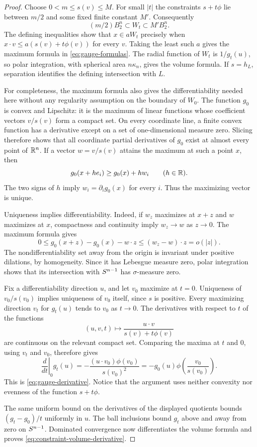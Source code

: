 \begin{proof}
Choose $0<m\le s(v)\le M$.  For small $|t|$ the constraints
$s+t\phi$ lie between $m/2$ and some fixed finite constant $M'$.
Consequently
\[
 (m/2)B_2^n\subset W_t\subset M'B_2^n.
\]
The defining inequalities show that $x\in aW_t$ precisely when
$x\cdot v\le a(s(v)+t\phi(v))$ for every $v$.  Taking the least
such $a$ gives the maximum formula in \eqref{eq:gauge-formulas}.
The radial function of $W_t$ is $1/g_t(u)$, so polar integration,
with spherical area $n\kappa_n$, gives the volume formula.  If
$s=h_L$, separation identifies the defining intersection with $L$.

For completeness, the maximum formula also gives the differentiability
needed here without any regularity assumption on the boundary of
$W_0$.  The function $g_0$ is convex and Lipschitz: it is the maximum
of linear functions whose coefficient vectors $v/s(v)$ form a compact
set.  On every coordinate line, a finite convex function has a
derivative except on a set of one-dimensional measure zero.  Slicing
therefore shows that all coordinate partial derivatives of $g_0$
exist at almost every point of $\mathbb R^n$.  If a vector $w=v/s(v)$ attains
the maximum at such a point $x$, then
\[
 g_0(x+he_i)\ge g_0(x)+h w_i\qquad(h\in\mathbb R).
\]
The two signs of $h$ imply $w_i=\partial_i g_0(x)$ for every $i$.
Thus the maximizing vector is unique.

Uniqueness implies differentiability.  Indeed, if $w_z$ maximizes at
$x+z$ and $w$ maximizes at $x$, compactness and continuity imply
$w_z\to w$ as $z\to0$.  The maximum formula gives
\[
 0\le g_0(x+z)-g_0(x)-w\cdot z
 \le (w_z-w)\cdot z=o(|z|).
\]
The nondifferentiability set away from the origin is invariant under
positive dilations, by homogeneity.  Since it has Lebesgue measure
zero, polar integration shows that its intersection with $S^{n-1}$ has
$\sigma$-measure zero.

Fix a differentiability direction $u$, and let $v_0$ maximize at
$t=0$.  Uniqueness of $v_0/s(v_0)$ implies uniqueness of $v_0$
itself, since $s$ is positive.  Every maximizing direction $v_t$ for
$g_t(u)$ tends to $v_0$ as $t\to0$.  The derivatives with respect
to $t$ of the functions
\[
 (u,v,t)\longmapsto\frac{u\cdot v}{s(v)+t\phi(v)}
\]
are continuous on the relevant compact set.  Comparing the maxima at
$t$ and $0$, using $v_t$ and $v_0$, therefore gives
\[
 \left.\frac{d}{dt}\right|_{0}g_t(u)
 =-\frac{(u\cdot v_0)\phi(v_0)}{s(v_0)^2}
 =-g_0(u)\phi\!\left(\frac{v_0}{s(v_0)}\right).
\]
This is \eqref{eq:gauge-derivative}.  Notice that the argument uses
neither convexity nor evenness of the function $s+t\phi$.

The same uniform bound on the derivatives of the displayed quotients
bounds $(g_t-g_0)/t$ uniformly in $u$.  The ball inclusions bound
$g_t$ above and away from zero on $S^{n-1}$.  Dominated convergence
now differentiates the volume formula and proves
\eqref{eq:constraint-volume-derivative}.
\end{proof}

